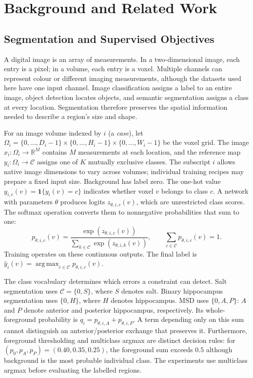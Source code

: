 \documentclass[12pt,a4paper]{article}
\begin{document}
\clearpage
\section{Background and Related Work}\label{sec:background}

\subsection{Segmentation and Supervised Objectives}
\label{sec:volumetric-segmentation}\label{sec:segmentation-objectives}

A digital image is an array of measurements. In a two-dimensional image,
each entry is a pixel; in a volume, each entry is a voxel. Multiple
channels can represent colour or different imaging measurements, although
the datasets used here have one input channel. Image classification
assigns a label to an entire image, object detection locates objects,
and semantic segmentation assigns a class at every location. Segmentation
therefore preserves the spatial information needed to describe a region's
size and shape.

For an image volume indexed by $i$ (a \emph{case}), let
$\Omega_i=\{0,\ldots,D_i-1\}\times\{0,\ldots,H_i-1\}\times
\{0,\ldots,W_i-1\}$ be the voxel grid. The image
$x_i:\Omega_i\to\mathbb R^M$ contains $M$ measurements at each location,
and the reference map $y_i:\Omega_i\to\mathcal C$ assigns one of $K$
mutually exclusive classes. The subscript $i$ allows native image dimensions
to vary across volumes; individual training recipes may prepare a fixed
input size. Background has label zero. The one-hot value
$y_{i,c}(v)=\mathbf1\{y_i(v)=c\}$ indicates whether voxel $v$ belongs to
class $c$. A network with parameters $\theta$ produces logits
$z_{\theta,i,c}(v)$, which are unrestricted class scores. The softmax
operation converts them to nonnegative probabilities that sum to one:
\begin{equation}
p_{\theta,i,c}(v)=
\frac{\exp(z_{\theta,i,c}(v))}
{\sum_{k\in\mathcal{C}}\exp(z_{\theta,i,k}(v))},
\qquad
\sum_{c\in\mathcal{C}}p_{\theta,i,c}(v)=1.
\label{eq:segmentation-softmax}
\end{equation}
Training operates on these continuous outputs. The final label is
$\widehat y_i(v)=\operatorname{arg\,max}_{c\in\mathcal C}
p_{\theta,i,c}(v)$. 

The class vocabulary determines which errors a constraint can detect.
Salt segmentation uses $\mathcal C=\{0,S\}$, where $S$ denotes salt.
Binary hippocampus segmentation uses $\{0,H\}$, where $H$ denotes
hippocampus. MSD uses $\{0,A,P\}$: $A$ and $P$ denote anterior and
posterior hippocampus, respectively. Its whole-foreground probability is
$q_i=p_{\theta,i,A}+p_{\theta,i,P}$. A term depending only on this sum
cannot distinguish an anterior/posterior exchange that preserves it.
Furthermore, foreground thresholding and multiclass argmax are distinct
decision rules: for $(p_0,p_A,p_P)=(0.40,0.35,0.25)$, the foreground sum
exceeds $0.5$ although background is the most probable individual class.
The experiments use multiclass argmax before evaluating the labelled
regions.
\end{document}
